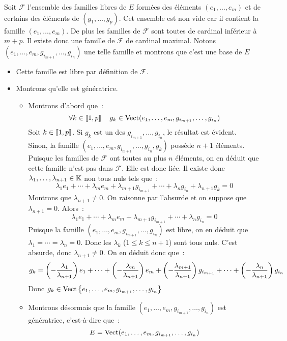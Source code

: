 \documentclass{magnolia}
\begin{document}
\begin{preuve}
Soit $\mathcal{F}$ l'ensemble des familles libres de $E$ formées des éléments
$(e_1,\ldots,e_m)$ et de certains des éléments de $(g_1,\ldots,g_p)$. Cet ensemble
est non vide car il contient la famille $(e_1,\ldots,e_m)$. De plus les familles
de $\mathcal{F}$ sont toutes de cardinal inférieur à $m+p$. Il existe
donc une famille de $\mathcal{F}$ de cardinal maximal. Notons
$(e_1,\ldots,e_m,g_{i_{m+1}},\ldots,g_{i_n})$ une telle famille et montrons que c'est
une base de $E$
\begin{itemize}
\item Cette famille est libre par définition de $\mathcal{F}$.
\item Montrons qu'elle est génératrice.
  \begin{itemize}
  \item Montrons d'abord que~:
    \[\forall k\in\left\llbracket 1,p\right\rrbracket \quad
      g_k\in\operatorname{Vect}(e_1,\ldots,e_m,g_{i_{m+1}},\ldots,g_{i_n})\]
    Soit $k\in\left\llbracket 1,p\right\rrbracket$. Si $g_k$ est un des $g_{i_{m+1}},\ldots,g_{i_n}$, le
    résultat est évident. \\
    Sinon, la famille
    $(e_1,\ldots,e_m,g_{i_{m+1}},\ldots,g_{i_n},g_k)$ possède $n+1$ éléments. Puisque
    les familles de $\mathcal{F}$ ont toutes au plus $n$ éléments, on en déduit
    que cette famille n'est pas dans $\mathcal{F}$. Elle est donc liée. Il existe
    donc $\lambda_1,\ldots,\lambda_{n+1} \in\mathbb{K}$ non tous nuls tels que~:
    \[\lambda_1 e_1+\cdots+\lambda_m e_m + \lambda_{m+1} g_{i_{m+1}}+\cdots+
      \lambda_n g_{i_n} + \lambda_{n+1} g_k=0\]
    Montrons que $\lambda_{n+1}\neq 0$. On raisonne par l'absurde et on suppose que
    $\lambda_{n+1}=0$. Alors~:
    \[\lambda_1 e_1+\cdots+\lambda_m e_m + \lambda_{m+1} g_{i_{m+1}}+\cdots+
      \lambda_n g_{i_n}=0\]
    Puisque la famille $(e_1,\ldots,e_m,g_{i_{m+1}},\ldots,g_{i_n})$ est libre, on en
    déduit que $\lambda_1=\cdots=\lambda_n=0$. Donc les $\lambda_k$
    ($1\leq k\leq n+1$) sont tous nuls. C'est absurde, donc $\lambda_{n+1}\neq 0$.
    On en déduit donc que~:
    \[g_k=\left(-\frac{\lambda_1}{\lambda_{n+1}}\right) e_1+\cdots+
          \left(-\frac{\lambda_m}{\lambda_{n+1}}\right) e_m +
          \left(-\frac{\lambda_{m+1}}{\lambda_{n+1}}\right) g_{i_{m+1}}+\cdots+
          \left(-\frac{\lambda_n}{\lambda_{n+1}}\right) g_{i_n}\]
    Donc $g_k\in\operatorname{Vect}\left\{e_1,\ldots,e_m,g_{i_{m+1}},\ldots,g_{i_n}\right\}$
  \item Montrons désormais que la famille $(e_1,\ldots,e_m,g_{i_{m+1}},\ldots,g_{i_n})$
    est génératrice, c'est-à-dire que~:
    \[E=\operatorname{Vect}(e_1,\ldots,e_m,g_{i_{m+1}},\ldots,g_{i_n})\]

\end{itemize}
\end{itemize}
\end{preuve}
\end{document}
